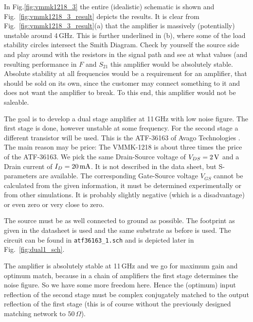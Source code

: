 In Fig.\ref{fig:vmmk1218_3} the entire (idealistic) schematic is shown
and Fig.~\ref{fig:vmmk1218_3_result} depicts the results. It is clear
from Fig.~\ref{fig:vmmk1218_3_result}(a)
that the amplifier is massively (potentially) unstable around
4\,GHz. This is further underlined in (b), where some of the load
stability circles intersect the Smith Diagram. Check by yourself the
source side and play around with the resistors in the signal path and
see at what values (and resulting performance in $F$ and $S_{21}$ this
amplifier would be absolutely stable. Absolute stability at all
frequencies would be a requirement for an amplifier, that should be
sold on its own, since the customer may connect something to it and
does not want the amplifier to break. To this end, this amplifier
would not be saleable. 


The goal is to develop a dual stage amplifier at 11\,GHz with low
noise figure. The first stage is done, however unstable at some
frequency. For the second stage a different transistor will be
used. This is the ATF-36163 of Avago Technologies
\cite{avagoatf36163}. The main reason may be price: The VMMK-1218 is
about three times the price of the ATF-36163. We pick the same
Drain-Source voltage of $V_{DS}=2\,\mathrm{V}$ and a Drain current of
$I_D=20\,\mathrm{mA}$. It is not described in the data sheet, but
S-parameters are available. The corresponding Gate-Source voltage
$V_{GS}$ cannot be calculated from the given information, it must be
determined experimentally or from other simulations. It is probably
slightly negative (which is a disadvantage) or even zero or very close
to zero.

The source must be as well connected to ground as possible. The
footprint as given in the datasheet is used and the same substrate as
before is used. The circuit can be found in {\tt atf36163\_1.sch} and
is depicted later in Fig.~\ref{fig:dual1_sch}.


The amplifier is absolutely stable at 11\,GHz and we go for
maximum gain and optimum match, because in a chain of amplifiers the
first stage determines the noise figure. So we have some more freedom
here. Hence the (optimum) input reflection of the second stage must be
complex conjugately matched to the output reflection of the first
stage (this is of course without the previously designed matching
network to $50\,\Omega$).

